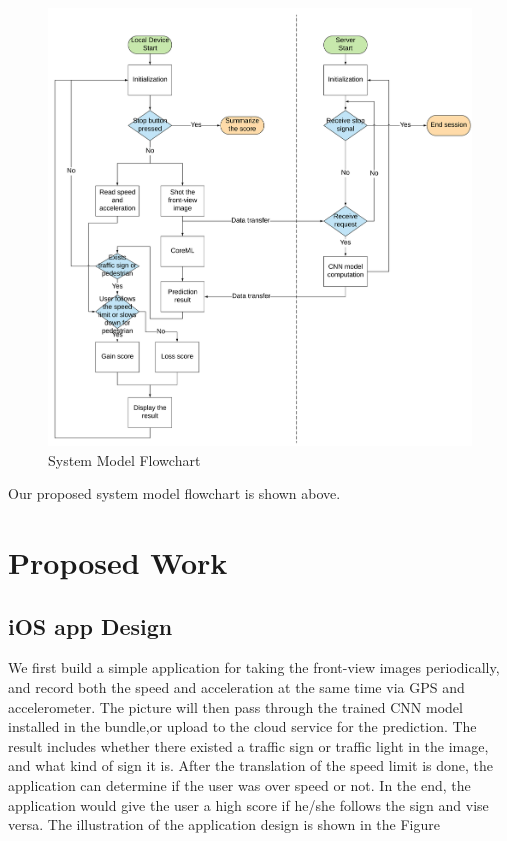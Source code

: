 \documentclass[conference]{IEEEtran}
\begin{document}
\begin{figure}[H]
\centering
  \begin{minipage}{.4\textwidth}
    \centering
    \includegraphics[width=1.2\linewidth]{system_flowchart.png}
    \caption{System Model Flowchart}
    \label{fig:fig_1}
  \end{minipage}
\end{figure}

Our proposed system model flowchart is shown above. 
\section{Proposed Work}
\subsection{iOS app Design}

We first build a simple application for taking the front-view images periodically, and record both the speed and acceleration at the same time via GPS and accelerometer. The picture will then pass through the trained CNN model installed in the bundle,or upload to the cloud service for the prediction. The result includes whether there existed a traffic sign or traffic light in the image, and what kind of sign it is. After the translation of the speed limit is done, the application can determine if the user was over speed or not. In the end, the application would give the user a high score if he/she follows the sign and vise versa. The illustration of the application design is shown in the Figure
\end{document}
